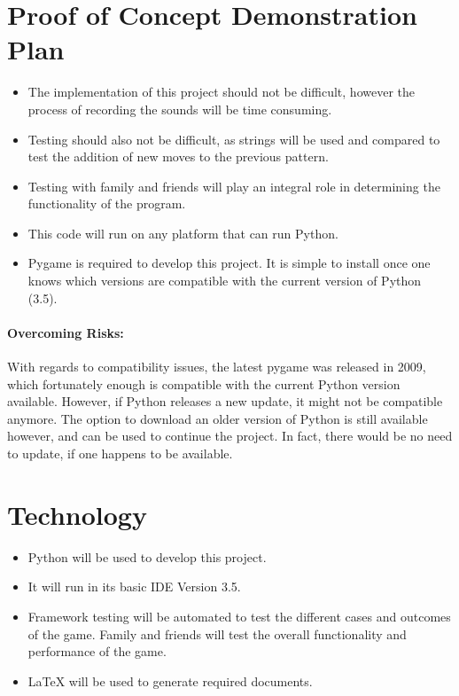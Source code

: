 \documentclass{article}
\begin{document}
\section{Proof of Concept Demonstration Plan}
\begin{itemize}
\item The implementation of this project should not be difficult, however the process of recording the sounds will be time consuming.
\item Testing should also not be difficult, as strings will be used and compared to test the addition of new moves to the previous pattern.
\item Testing with family and friends will play an integral role in determining the functionality of the program.
\item This code will run on any platform that can run Python.
\item Pygame is required to develop this project. It is simple to install once one knows which versions are compatible with the current version of Python (3.5).
\end{itemize}
\paragraph{Overcoming Risks:}
With regards to compatibility issues, the latest pygame was released in 2009, which fortunately enough is compatible with the current Python version available. However, if Python releases a new update, it might not be compatible anymore. The option to download an older version of Python is still available however, and can be used to continue the project. In fact, there would be no need to update, if one happens to be available.
\section{Technology}
\begin{itemize}
\item Python will be used to develop this project.
\item It will run in its basic IDE Version 3.5.
\item Framework testing will be automated to test the different cases and outcomes of the game. Family and friends will test the overall functionality and performance of the game.
\item LaTeX will be used to generate required documents.
\end{itemize}
\end{document}
